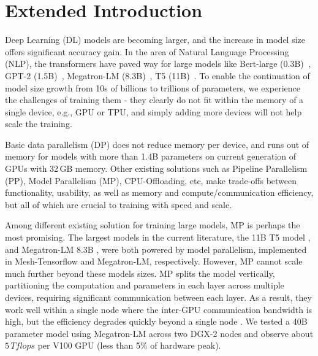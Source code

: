 \section{Extended Introduction}
\label{sec:introduction}
Deep Learning (DL) models are becoming larger, and the increase in model size offers significant accuracy gain. In the area of Natural Language Processing (NLP), the transformers have paved way for large models like Bert-large (0.3B)~\cite{DBLP:journals/corr/bert}, GPT-2 (1.5B)~\cite{gpt-2}, Megatron-LM (8.3B)~\cite{megatronlm}, T5 (11B)~\cite{T5}. To enable the continuation of model size growth from 10s of billions to trillions of parameters, we experience the challenges of training them - they clearly do not fit within the memory of a single device, e.g., GPU or TPU, and simply adding more devices will not help scale the training.  

Basic data parallelism (DP) does not reduce memory per device, and runs out of memory for models with more than 1.4B parameters on current generation of GPUs with 32\,GB memory. Other existing solutions such as Pipeline Parallelism (PP), Model Parallelism (MP), CPU-Offloading, etc, make trade-offs between functionality, usability, as well as memory and compute/communication efficiency, but all of which are crucial to training with speed and scale. %

Among different existing solution for training large models, MP is perhaps the most promising. The largest models in the current literature, the 11B T5 model \cite{T5}, and Megatron-LM 8.3B \cite{megatronlm}, were both powered by model parallelism, implemented in Mesh-Tensorflow \cite{DBLP:journals/corr/mesh-tensor} and Megatron-LM\cite{megatronlm}, respectively. However, MP cannot scale much further beyond these models sizes. MP splits the model vertically, partitioning the computation and parameters in each layer across multiple devices, requiring significant communication between each layer. As a result, they work well within a single node where the inter-GPU communication bandwidth is high, but the efficiency degrades quickly beyond a single node \cite{megatronlm}. We tested a 40B parameter model using Megatron-LM across two DGX-2 nodes and observe about $5\,Tflops$ per V100 GPU (less than 5\% of hardware peak).    

